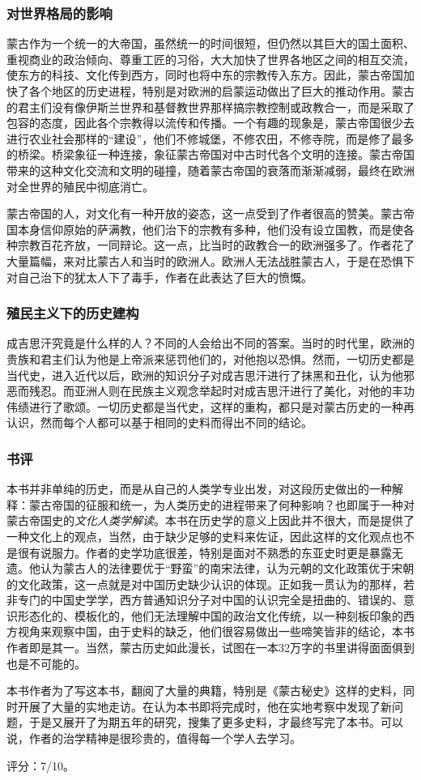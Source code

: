 \subsubsection{对世界格局的影响}
蒙古作为一个统一的大帝国，虽然统一的时间很短，但仍然以其巨大的国土面积、重视商业的政治倾向、尊重工匠的习俗，大大加快了世界各地区之间的相互交流，使东方的科技、文化传到西方，同时也将中东的宗教传入东方。因此，蒙古帝国加快了各个地区的历史进程，特别是对欧洲的启蒙运动做出了巨大的推动作用。蒙古的君主们没有像伊斯兰世界和基督教世界那样搞宗教控制或政教合一，而是采取了包容的态度，因此各个宗教得以流传和传播。一个有趣的现象是，蒙古帝国很少去进行农业社会那样的“建设”，他们不修城堡，不修农田，不修寺院，而是修了最多的桥梁。桥梁象征一种连接，象征蒙古帝国对中古时代各个文明的连接。蒙古帝国带来的这种文化交流和文明的碰撞，随着蒙古帝国的衰落而渐渐减弱，最终在欧洲对全世界的殖民中彻底消亡。

蒙古帝国的人，对文化有一种开放的姿态，这一点受到了作者很高的赞美。蒙古帝国本身信仰原始的萨满教，他们治下的宗教有多种，他们没有设立国教，而是使各种宗教百花齐放，一同辩论。这一点，比当时的政教合一的欧洲强多了。作者花了大量篇幅，来对比蒙古人和当时的欧洲人。欧洲人无法战胜蒙古人，于是在恐惧下对自己治下的犹太人下了毒手，作者在此表达了巨大的愤慨。

\subsubsection{殖民主义下的历史建构}
成吉思汗究竟是什么样的人？不同的人会给出不同的答案。当时的时代里，欧洲的贵族和君主们认为他是上帝派来惩罚他们的，对他抱以恐惧。然而，一切历史都是当代史，进入近代以后，欧洲的知识分子对成吉思汗进行了抹黑和丑化，认为他邪恶而残忍。而亚洲人则在民族主义观念举起时对成吉思汗进行了美化，对他的丰功伟绩进行了歌颂。一切历史都是当代史，这样的重构，都只是对蒙古历史的一种再认识，然而每个人都可以基于相同的史料而得出不同的结论。

\subsubsection{书评}
本书并非单纯的历史，而是从自己的人类学专业出发，对这段历史做出的一种解释：蒙古帝国的征服和统一，为人类历史的进程带来了何种影响？也即属于一种对蒙古帝国史的\emph{文化人类学解读}。本书在历史学的意义上因此并不很大，而是提供了一种文化上的观点，当然，由于缺少足够的史料来佐证，因此这样的文化观点也不是很有说服力。作者的史学功底很差，特别是面对不熟悉的东亚史时更是暴露无遗。他认为蒙古人的法律要优于“野蛮”的南宋法律，认为元朝的文化政策优于宋朝的文化政策，这一点就是对中国历史缺少认识的体现。正如我一贯认为的那样，若非专门的中国史学学，西方普通知识分子对中国的认识完全是扭曲的、错误的、意识形态化的、模板化的，他们无法理解中国的政治文化传统，以一种刻板印象的西方视角来观察中国，由于史料的缺乏，他们很容易做出一些啼笑皆非的结论，本书作者即是其一。当然，蒙古历史如此漫长，试图在一本32万字的书里讲得面面俱到也是不可能的。

本书作者为了写这本书，翻阅了大量的典籍，特别是《蒙古秘史》这样的史料，同时开展了大量的实地走访。在认为本书即将完成时，他在实地考察中发现了新问题，于是又展开了为期五年的研究，搜集了更多史料，才最终写完了本书。可以说，作者的治学精神是很珍贵的，值得每一个学人去学习。

评分：7/10。